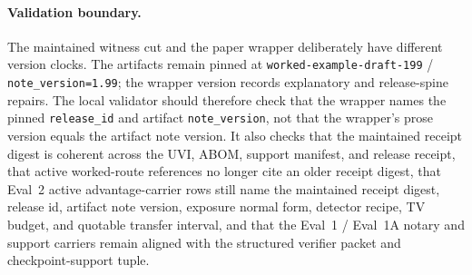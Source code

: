 \documentclass[11pt]{article}
\begin{document}
\paragraph{Validation boundary.}
The maintained witness cut and the paper wrapper deliberately have different version clocks. The artifacts remain pinned at \texttt{worked-example-draft-199} / \texttt{note\_version=1.99}; the wrapper version records explanatory and release-spine repairs. The local validator should therefore check that the wrapper names the pinned \texttt{release\_id} and artifact \texttt{note\_version}, not that the wrapper's prose version equals the artifact note version. It also checks that the maintained receipt digest is coherent across the UVI, ABOM, support manifest, and release receipt, that active worked-route references no longer cite an older receipt digest, that Eval~2 active advantage-carrier rows still name the maintained receipt digest, release id, artifact note version, exposure normal form, detector recipe, TV budget, and quotable transfer interval, and that the Eval~1 / Eval~1A notary and support carriers remain aligned with the structured verifier packet and checkpoint-support tuple.
\end{document}
